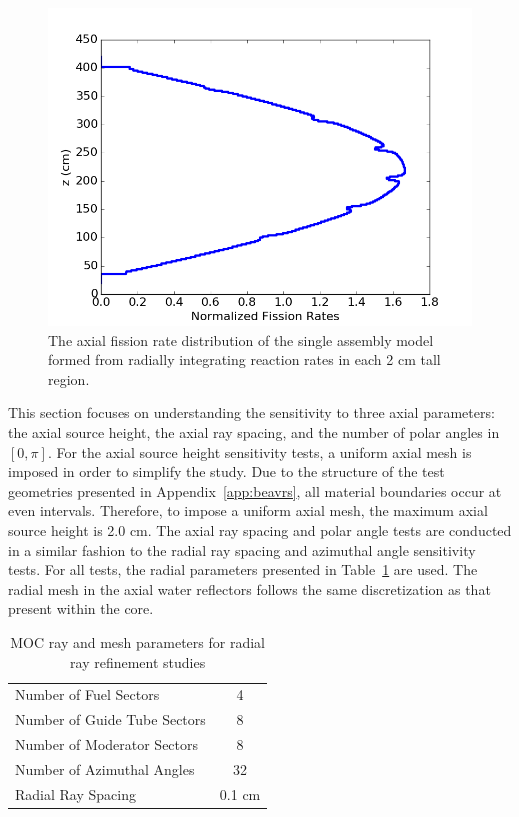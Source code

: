 \begin{figure}[h!]
	\centering
	\includegraphics[width=0.7\linewidth]{figures/results/rr-plots/single-assembly-axial.png}
	\caption[]{The axial fission rate distribution of the single assembly model formed from radially integrating reaction rates in each 2 cm tall region.}
	\label{fig:single-assembly-axial}
\end{figure}

This section focuses on understanding the sensitivity to three axial parameters: the axial source height, the axial ray spacing, and the number of polar angles in $[0, \pi]$. For the axial source height sensitivity tests, a uniform axial mesh is imposed in order to simplify the study. Due to the structure of the test geometries presented in Appendix~\ref{app:beavrs}, all material boundaries occur at even intervals. Therefore, to impose a uniform axial mesh, the maximum axial source height is 2.0 cm. The axial ray spacing and polar angle tests are conducted in a similar fashion to the radial ray spacing and azimuthal angle sensitivity tests. For all tests, the radial parameters presented in Table~\ref{tab:axial-test-radial-params} are used. The radial mesh in the axial water reflectors follows the same discretization as that present within the core.

\begin{table}[ht]
	\centering
	\caption{MOC ray and mesh parameters for radial ray refinement studies}
	\medskip
	\begin{tabular}{lc}
		\hline
		Number of Fuel Sectors & 4 \\
		Number of Guide Tube Sectors & 8 \\
		Number of Moderator Sectors & 8 \\
		Number of Azimuthal Angles & 32 \\
		Radial Ray Spacing & 0.1 cm \\
		\hline
	\end{tabular}
	\label{tab:axial-test-radial-params}
\end{table}

